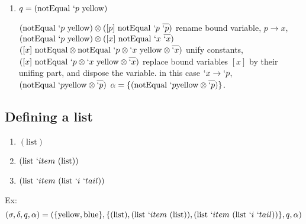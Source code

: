 \documentclass[11pt,a4paper]{report}
\newcommand{\var}[1]{`#1}
\newcommand{\unify}{\otimes}
\begin{document}
\begin{enumerate}
\item $q = (\text{notEqual}\ \var{p}\ \text{yellow})$

\subitem $(\text{notEqual}\ \var{p}\ \text{yellow}) \unify ([p]\ \text{notEqual}\ \var{p}\ \overline{\var{p}})$
\subitem rename bound variable, $p \rightarrow x$,
\subitem $(\text{notEqual}\ \var{p}\ \text{yellow}) \unify ([x]\ \text{notEqual}\ \var{x}\ \overline{\var{x}})$
\subitem $([x]\ \text{notEqual} \unify \text{notEqual}\ \var{p} \unify \var{x}\ \text{yellow} \unify \overline{\var{x}})$
\subitem unify constants, $([x]\ \text{notEqual}\ \var{p} \unify \var{x}\ \text{yellow} \unify \overline{\var{x}})$
\subitem replace bound variables $[x]$ by their unifing part, and dispose the variable.
\subitem in this case $\var{x} \rightarrow \var{p}$, $(\text{notEqual}\ \var{p} \text{yellow} \unify \overline{\var{p}})$
\subitem $\alpha=\{(\text{notEqual}\ \var{p} \text{yellow} \unify \overline{\var{p}})\}$.
\end{enumerate}


\subsection{Defining a list}

\begin{enumerate}
\item $(\text{list})$
\item $(\text{list}\ \var{item}\ (\text{list}))$
\item $(\text{list}\ \var{item}\ (\text{list}\ \var{i}\ \var{tail}))$
\end{enumerate}

Ex:
\[
    (\sigma, \delta, q, \alpha ) = (\{\text{yellow}, \text{blue}\},
    \{
(\text{list}),
(\text{list}\ \var{item}\ (\text{list})),
(\text{list}\ \var{item}\ (\text{list}\ \var{i}\ \var{tail}))
    \}, q, \alpha)
\]
\end{document}
